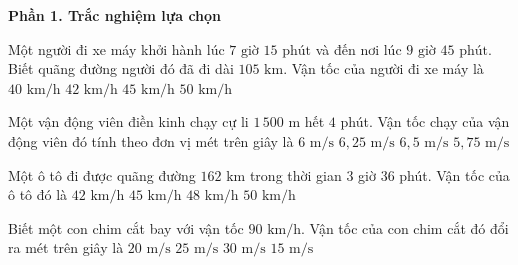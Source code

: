 \textbf{Phần 1. Trắc nghiệm lựa chọn}

\begin{ex} %
Một người đi xe máy khởi hành lúc $7\text{ giờ } 15\text{ phút}$ và đến nơi lúc $9\text{ giờ } 45\text{ phút}$. Biết quãng đường người đó đã đi dài $105\text{ km}$. Vận tốc của người đi xe máy là
\choice
{$40\text{ km/h}$}
{\True $42\text{ km/h}$}
{$45\text{ km/h}$}
{$50\text{ km/h}$}
\end{ex}

\begin{ex} %
Một vận động viên điền kinh chạy cự li $1\,500\text{ m}$ hết $4$ phút. Vận tốc chạy của vận động viên đó tính theo đơn vị mét trên giây là
\choice
{$6\text{ m/s}$}
{\True $6{,}25\text{ m/s}$}
{$6{,}5\text{ m/s}$}
{$5{,}75\text{ m/s}$}
\end{ex}

\begin{ex} %
Một ô tô đi được quãng đường $162\text{ km}$ trong thời gian $3$ giờ $36$ phút. Vận tốc của ô tô đó là
\choice
{$42\text{ km/h}$}
{\True $45\text{ km/h}$}
{$48\text{ km/h}$}
{$50\text{ km/h}$}
\end{ex}

\begin{ex} %
Biết một con chim cắt bay với vận tốc $90\text{ km/h}$. Vận tốc của con chim cắt đó đổi ra mét trên giây là
\choice
{$20\text{ m/s}$}
{\True $25\text{ m/s}$}
{$30\text{ m/s}$}
{$15\text{ m/s}$}
\end{ex}

